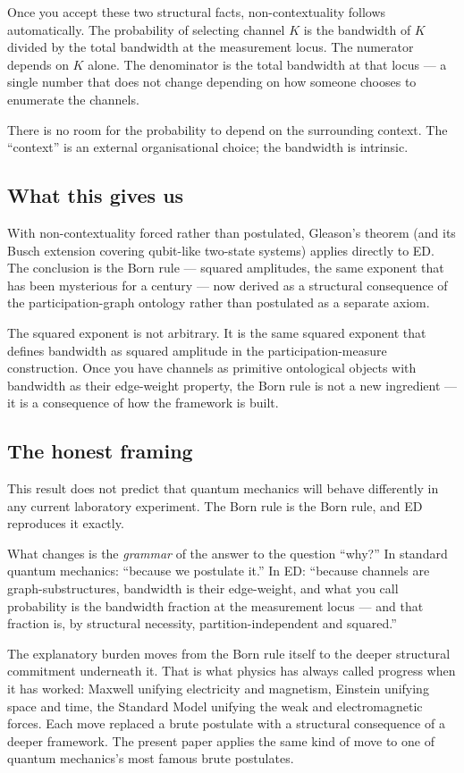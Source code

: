 \documentclass[11pt,a4paper]{article}
\begin{document}
Once you accept these two structural facts, non-contextuality follows automatically. The probability of selecting channel $K$ is the bandwidth of $K$ divided by the total bandwidth at the measurement locus. The numerator depends on $K$ alone. The denominator is the total bandwidth at that locus --- a single number that does not change depending on how someone chooses to enumerate the channels.

There is no room for the probability to depend on the surrounding context. The ``context'' is an external organisational choice; the bandwidth is intrinsic.

\subsection{What this gives us}

With non-contextuality forced rather than postulated, Gleason's theorem (and its Busch extension covering qubit-like two-state systems) applies directly to ED. The conclusion is the Born rule --- squared amplitudes, the same exponent that has been mysterious for a century --- now derived as a structural consequence of the participation-graph ontology rather than postulated as a separate axiom.

The squared exponent is not arbitrary. It is the same squared exponent that defines bandwidth as squared amplitude in the participation-measure construction. Once you have channels as primitive ontological objects with bandwidth as their edge-weight property, the Born rule is not a new ingredient --- it is a consequence of how the framework is built.

\subsection{The honest framing}

This result does not predict that quantum mechanics will behave differently in any current laboratory experiment. The Born rule is the Born rule, and ED reproduces it exactly.

What changes is the \emph{grammar} of the answer to the question ``why?'' In standard quantum mechanics: ``because we postulate it.'' In ED: ``because channels are graph-substructures, bandwidth is their edge-weight, and what you call probability is the bandwidth fraction at the measurement locus --- and that fraction is, by structural necessity, partition-independent and squared.''

The explanatory burden moves from the Born rule itself to the deeper structural commitment underneath it. That is what physics has always called progress when it has worked: Maxwell unifying electricity and magnetism, Einstein unifying space and time, the Standard Model unifying the weak and electromagnetic forces. Each move replaced a brute postulate with a structural consequence of a deeper framework. The present paper applies the same kind of move to one of quantum mechanics's most famous brute postulates.
\end{document}

